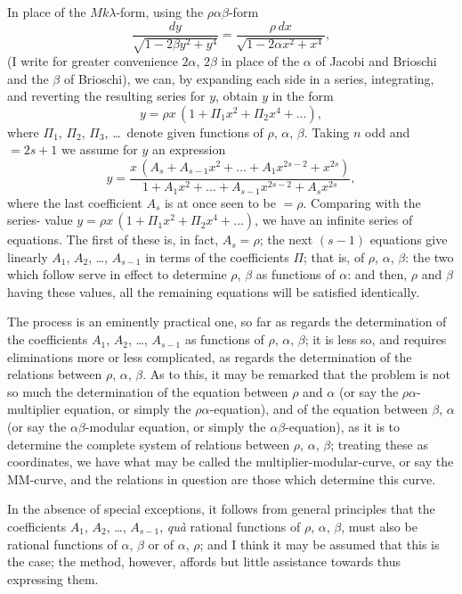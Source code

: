 \documentclass[12pt,a4paper]{article}
\theoremstyle{definition}
\begin{document}
In place of the $Mk\lambda$-form, using the $\rho\alpha\beta$-form
\[
\frac{dy}{\sqrt{1 - 2\beta y^2 + y^4}} = \frac{\rho\, dx}{\sqrt{1 - 2\alpha x^2 + x^4}},
\]
(I write for greater convenience $2\alpha$, $2\beta$ in place of the $\alpha$ of Jacobi and Brioschi and
the $\beta$ of Brioschi), we can, by expanding each side in a series, integrating, and
reverting the resulting series for $y$, obtain $y$ in the form
\[
y = \rho x\, (1 + \Pi_1 x^2 + \Pi_2 x^4 + \ldots),
\]
where $\Pi_1$, $\Pi_2$, $\Pi_3$, \ldots\ denote given functions of $\rho$, $\alpha$, $\beta$. Taking $n$ odd and $= 2s + 1$
we assume for $y$ an expression
\[
y = \frac{x\, (A_s + A_{s-1} x^2 + \ldots + A_1 x^{2s-2} + x^{2s})}
{1 + A_1 x^2 + \ldots + A_{s-1} x^{2s-2} + A_s x^{2s}},
\]
where the last coefficient $A_s$ is at once seen to be $= \rho$. Comparing with the series-
value $y = \rho x\, (1 + \Pi_1 x^2 + \Pi_2 x^4 + \ldots)$, we have an infinite series of equations.
The first of these is, in fact, $A_s = \rho$; the next $(s-1)$ equations give linearly $A_1$, $A_2$, \ldots,
$A_{s-1}$ in terms of the coefficients $\Pi$; that is, of $\rho$, $\alpha$, $\beta$: the two which follow serve in
effect to determine $\rho$, $\beta$ as functions of $\alpha$: and then, $\rho$ and $\beta$ having these values,
all the remaining equations will be satisfied identically.

The process is an eminently practical one, so far as regards the determination
of the coefficients $A_1$, $A_2$, \ldots, $A_{s-1}$ as functions of $\rho$, $\alpha$, $\beta$; it is less so, and requires
eliminations more or less complicated, as regards the determination of the relations
between $\rho$, $\alpha$, $\beta$. As to this, it may be remarked that the problem is not so much
the determination of the equation between $\rho$ and $\alpha$ (or say the $\rho\alpha$-multiplier equation,
or simply the $\rho\alpha$-equation), and of the equation between $\beta$, $\alpha$ (or say the
$\alpha\beta$-modular equation, or simply the $\alpha\beta$-equation), as it is to determine the complete
system of relations between $\rho$, $\alpha$, $\beta$; treating these as coordinates, we have what may
be called the multiplier-modular-curve, or say the MM-curve, and the relations in
question are those which determine this curve.

In the absence of special exceptions, it follows from general principles that the
coefficients $A_1$, $A_2$, \ldots, $A_{s-1}$, \textit{qu\`{a}} rational functions of $\rho$, $\alpha$, $\beta$, must also be rational
functions of $\alpha$, $\beta$ or of $\alpha$, $\rho$; and I think it may be assumed that this is the case;
the method, however, affords but little assistance towards thus expressing them.
\end{document}
